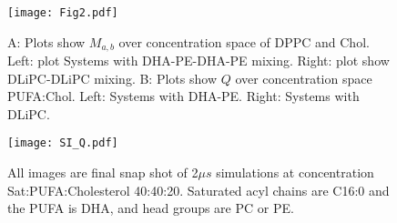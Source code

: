 	\begin{figure}[h!]
		\center
		\texttt{[image: Fig2.pdf]}
		\caption{A: Plots show $M_{a,b}$ over concentration space of DPPC and Chol. Left: plot Systems with DHA-PE-DHA-PE mixing. Right: plot show DLiPC-DLiPC mixing. B: Plots show $Q$ over concentration space PUFA:Chol. Left: Systems with DHA-PE. Right: Systems with DLiPC.}
		\label{fig:fig2}
	\end{figure} 

	\begin{figure}[!ht]
		\center
		\texttt{[image: SI\_Q.pdf]}
		\caption{All images are final snap shot of 2$\mu s$ simulations at concentration Sat:PUFA:Cholesterol 40:40:20. Saturated acyl chains are C16:0 and the PUFA is DHA, and head groups are PC or PE.}
		\label{fig:SIQ}
	\end{figure}





